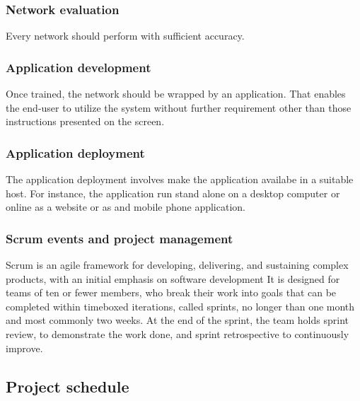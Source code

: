 \documentclass{article}
\begin{document}
\subsubsection{Network evaluation}
\label{sec:org8eee749}
Every network should perform with sufficient accuracy.
\subsubsection{Application development}
\label{sec:org21fe247}
Once trained, the network should be wrapped by an application.
That enables the end-user to utilize the system without further requirement other than those instructions presented on the screen.
\subsubsection{Application deployment}
\label{sec:org13ef25f}
The application deployment involves make the application availabe in a suitable host.
For instance, the application run stand alone on a desktop computer or online as a website or as and mobile phone application.
\subsubsection{Scrum events and project management}
\label{sec:org03280ee}
Scrum is an agile framework for developing, delivering, and sustaining complex products, with an initial emphasis on software development
It is designed for teams of ten or fewer members, who break their work into goals that can be completed within timeboxed iterations, called sprints, no longer than one month and most commonly two weeks.
At the end of the sprint, the team holds sprint review, to demonstrate the work done, and sprint retrospective to continuously improve.

\subsection{Project schedule}
\label{sec:org61dc597}
\end{document}
